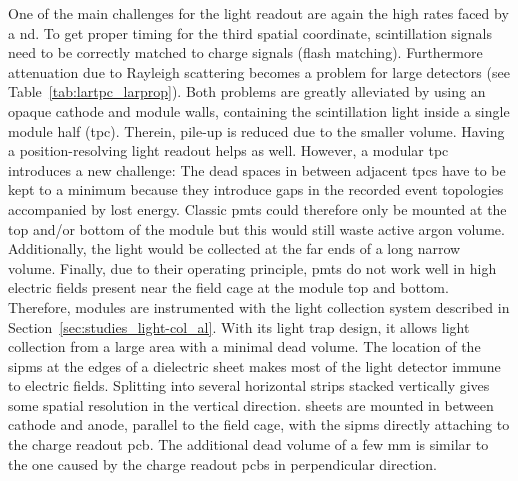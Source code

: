 One of the main challenges for the light readout are again the high rates faced by a \gls{nd}.
To get proper timing for the third spatial coordinate, scintillation signals need to be correctly matched to charge signals (flash matching).
Furthermore attenuation due to Rayleigh scattering becomes a problem for large detectors (see Table~\ref{tab:lartpc_larprop}).
Both problems are greatly alleviated by using an opaque cathode and module walls, containing the scintillation light inside a single module half (\gls{tpc}).
Therein, pile-up is reduced due to the smaller volume.
Having a position-resolving light readout helps as well.
However, a modular \gls{tpc} introduces a new challenge: The dead spaces in between adjacent \glspl{tpc} have to be kept to a minimum because they introduce gaps in the recorded event topologies accompanied by lost energy.
Classic \glspl{pmt} could therefore only be mounted at the top and/or bottom of the module but this would still waste active argon volume.
Additionally, the light would be collected at the far ends of a long narrow volume.
Finally, due to their operating principle, \glspl{pmt} do not work well in high electric fields present near the field cage at the module top and bottom.
Therefore, \AC{} modules are instrumented with the \AL{} light collection system described in Section~\ref{sec:studies_light-col_al}.
With its light trap design, it  allows light collection from a large area with a minimal dead volume.
The location of the \glspl{sipm} at the edges of a dielectric sheet makes most of the light detector immune to electric fields.
Splitting \AL{} into several horizontal strips stacked vertically gives some spatial resolution in the vertical direction.
\AL{} sheets are mounted in between cathode and anode, parallel to the field cage, with the \glspl{sipm} directly attaching to the charge readout \gls{pcb}.
The additional dead volume of a few \si{\milli\metre} is similar to the one caused by the charge readout \glspl{pcb} in perpendicular direction.